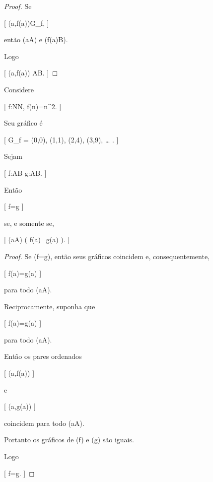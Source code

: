 \documentclass[../../main]{subfiles}
\begin{document}
\begin{proof}

	Se

	[
	(a,f(a))\in G_f,
	]

	então (a\in A) e (f(a)\in B).

	Logo

		[
			(a,f(a))
			\in
			A\times B.
		]

\end{proof}

\begin{ex}

	Considere

	[
	f:\mathbb N\to\mathbb N,
	\qquad
	f(n)=n^2.
	]

	Seu gráfico é

	[
	G_f
		=
		{
			(0,0),
			(1,1),
			(2,4),
			(3,9),
			\ldots
		}.
	]

\end{ex}

\begin{prop}
	\label{prop:matematica:funcoes:fundamentos:extensionalidade}

	Sejam

		[
			f:A\to B
			\quad\text{e}\quad
			g:A\to B.
		]

	Então

	[
	f=g
	]

	se, e somente se,

	[
			(\forall a\in A)
			\bigl(
			f(a)=g(a)
			\bigr).
		]

\end{prop}

\begin{proof}

	Se (f=g), então seus gráficos coincidem e,
	consequentemente,

	[
			f(a)=g(a)
		]

	para todo (a\in A).

	Reciprocamente, suponha que

		[
			f(a)=g(a)
		]

	para todo (a\in A).

	Então os pares ordenados

		[
			(a,f(a))
		]

	e

		[
			(a,g(a))
		]

	coincidem para todo (a\in A).

	Portanto os gráficos de (f) e (g) são iguais.

	Logo

		[
			f=g.
		]

\end{proof}
\end{document}
